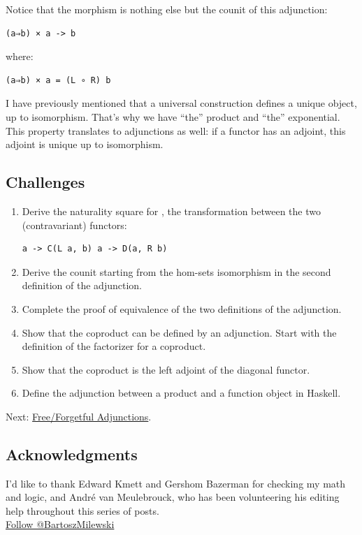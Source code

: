 Notice that the  morphism is nothing else but the counit of
this adjunction:

\begin{verbatim}
(a⇒b) × a -> b
\end{verbatim}

where:

\begin{verbatim}
(a⇒b) × a = (L ∘ R) b
\end{verbatim}

I have previously mentioned that a universal construction defines a
unique object, up to isomorphism. That's why we have ``the'' product and
``the'' exponential. This property translates to adjunctions as well: if
a functor has an adjoint, this adjoint is unique up to isomorphism.

\subsection{Challenges}\label{challenges}

\begin{enumerate}
\item
  Derive the naturality square for , the transformation
  between the two (contravariant) functors:

\begin{verbatim}
a -> C(L a, b) a -> D(a, R b)
\end{verbatim}
\item
  Derive the counit  starting from the hom-sets isomorphism in
  the second definition of the adjunction.
\item
  Complete the proof of equivalence of the two definitions of the
  adjunction.
\item
  Show that the coproduct can be defined by an adjunction. Start with
  the definition of the factorizer for a coproduct.
\item
  Show that the coproduct is the left adjoint of the diagonal functor.
\item
  Define the adjunction between a product and a function object in
  Haskell.
\end{enumerate}

Next:
\href{https://bartoszmilewski.com/2016/06/15/freeforgetful-adjunctions/}{Free/Forgetful
Adjunctions}.

\subsection{Acknowledgments}\label{acknowledgments}

I'd like to thank Edward Kmett and Gershom Bazerman for checking my math
and logic, and André van Meulebrouck, who has been volunteering his
editing help throughout this series of posts.\\
\href{https://twitter.com/BartoszMilewski}{Follow @BartoszMilewski}
